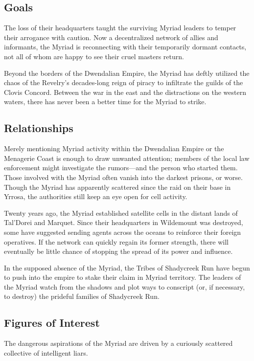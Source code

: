 \documentclass[10pt,a4paper,twoside,bg=print,twocolumn,openany,nodeprecatedcode]{dndbook}
\begin{document}
\subsection{Goals}
The loss of their headquarters taught the surviving Myriad leaders to temper their arrogance with caution. Now a decentralized network of allies and informants, the Myriad is reconnecting with their temporarily dormant contacts, not all of whom are happy to see their cruel masters return.

Beyond the borders of the Dwendalian Empire, the Myriad has deftly utilized the chaos of the Revelry's decades-long reign of piracy to infiltrate the guilds of the Clovis Concord. Between the war in the east and the distractions on the western waters, there has never been a better time for the Myriad to strike.

\subsection{Relationships}
Merely mentioning Myriad activity within the Dwendalian Empire or the Menagerie Coast is enough to draw unwanted attention; members of the local law enforcement might investigate the rumors—and the person who started them. Those involved with the Myriad often vanish into the darkest prisons, or worse. Though the Myriad has apparently scattered since the raid on their base in Yrrosa, the authorities still keep an eye open for cell activity.

Twenty years ago, the Myriad established satellite cells in the distant lands of Tal'Dorei and Marquet. Since their headquarters in Wildemount was destroyed, some have suggested sending agents across the oceans to reinforce their foreign operatives. If the network can quickly regain its former strength, there will eventually be little chance of stopping the spread of its power and influence.

In the supposed absence of the Myriad, the Tribes of Shadycreek Run have begun to push into the empire to stake their claim in Myriad territory. The leaders of the Myriad watch from the shadows and plot ways to conscript (or, if necessary, to destroy) the prideful families of Shadycreek Run.

\subsection{Figures of Interest}
The dangerous aspirations of the Myriad are driven by a curiously scattered collective of intelligent liars.
\end{document}
